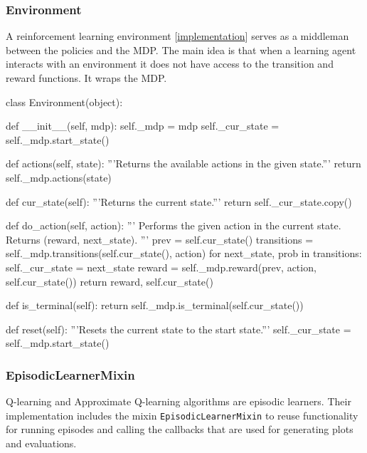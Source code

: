 \documentclass{article}
\newcommand{\GithubURL}[1]{[\href{https://github.com/davidrobles/mlnd-capstone-code/blob/master/#1}{implementation}]}
\begin{document}
\subsubsection{Environment}

A reinforcement learning environment \GithubURL{capstone/rl/environment.py} serves as a middleman
between the policies and the MDP. The main idea is that when a learning agent interacts with an
environment it does not have access to the transition and reward functions. It wraps the MDP.

\begin{python}
class Environment(object):

    def __init__(self, mdp):
        self._mdp = mdp
        self._cur_state = self._mdp.start_state()

    def actions(self, state):
        '''Returns the available actions in the given state.'''
        return self._mdp.actions(state)

    def cur_state(self):
        '''Returns the current state.'''
        return self._cur_state.copy()

    def do_action(self, action):
        '''
        Performs the given action in the current state.
        Returns (reward, next_state).
        '''
        prev = self.cur_state()
        transitions = self._mdp.transitions(self.cur_state(), action)
        for next_state, prob in transitions:
            self._cur_state = next_state
        reward = self._mdp.reward(prev, action, self.cur_state())
        return reward, self.cur_state()

    def is_terminal(self):
        return self._mdp.is_terminal(self.cur_state())

    def reset(self):
        '''Resets the current state to the start state.'''
        self._cur_state = self._mdp.start_state()
\end{python}

\subsubsection{EpisodicLearnerMixin}

Q-learning and Approximate Q-learning algorithms are episodic learners. Their implementation
includes the mixin \texttt{EpisodicLearnerMixin} to reuse functionality for running episodes and
calling the callbacks that are used for generating plots and evaluations.
\end{document}
